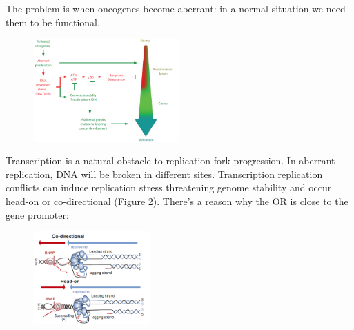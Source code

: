 The problem is when oncogenes become aberrant: in a normal situation we
need them to be functional.

\begin{figure}[H]
\centering
\includegraphics[width=0.5\textwidth]{../_resources/61c42671b1b95714d2335e1c23a75024.png} 
\label{fig:senescence}
\end{figure}

Transcription is a natural obstacle to replication fork progression. In
aberrant replication, DNA will be broken in different sites. 
Transcription replication conflicts can induce replication stress
threatening genome stability and
occur head-on or co-directional (Figure \ref{fig:conflict}). There's a reason why the OR is close to
the gene promoter:

\begin{figure}[h!]
\centering
\includegraphics[width=0.4\textwidth]{../_resources/7e83b9f1b770e9e66657e633c833c9a4.png}
\label{fig:conflict}
\end{figure}

